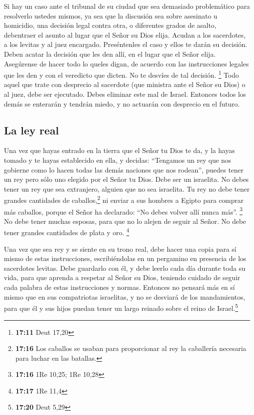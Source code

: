  Si hay un caso ante el tribunal de su ciudad que sea
demasiado problemático para resolverlo ustedes mismos, ya sea que la
discusión sea sobre asesinato u homicidio, una decisión legal contra
otra, o diferentes grados de asalto, debentraer el asunto al lugar que
el Señor su Dios elija.  Acudan a los sacerdotes, a los
levitas y al juez encargado. Preséntenles el caso y ellos te darán su
decisión.  Deben acatar la decisión que les den allí, en
el lugar que el Señor elija. Asegúrense de hacer todo lo queles digan,
 de acuerdo con las instrucciones legales que les den y
con el veredicto que dicten. No te desvíes de tal decisión. \footnote{\textbf{17:11}
  Deut 17,20}  Todo aquel que trate con desprecio al
sacerdote (que ministra ante el Señor su Dios) o al juez, debe ser
ejecutado. Debes eliminar este mal de Israel.  Entonces
todos los demás se enterarán y tendrán miedo, y no actuarán con
desprecio en el futuro.

\hypertarget{la-ley-real}{%
\subsection{La ley real}\label{la-ley-real}}

 Una vez que hayas entrado en la tierra que el Señor tu
Dios te da, y la hayas tomado y te hayas establecido en ella, y decidas:
``Tengamos un rey que nos gobierne como lo hacen todas las demás
naciones que nos rodean'',  puedes tener un rey pero sólo
uno elegido por el Señor tu Dios. Debe ser un israelita. No debes tener
un rey que sea extranjero, alguien que no sea israelita. 
Tu rey no debe tener grandes cantidades de caballos,\footnote{\textbf{17:16}
  Los caballos se usaban para proporcionar al rey la caballería
  necesaria para luchar en las batallas.} ni enviar a sus hombres a
Egipto para comprar más caballos, porque el Señor ha declarado: ``No
debes volver allí nunca más''. \footnote{\textbf{17:16} 1Re 10,25; 1Re
  10,28}  No debe tener muchas esposas, para que no lo
alejen de seguir al Señor. No debe tener grandes cantidades de plata y
oro. \footnote{\textbf{17:17} 1Re 11,4}

 Una vez que sea rey y se siente en su trono real, debe
hacer una copia para sí mismo de estas instrucciones, escribiéndolas en
un pergamino en presencia de los sacerdotes levitas. 
Debe guardarlo con él, y debe leerlo cada día durante toda su vida, para
que aprenda a respetar al Señor su Dios, teniendo cuidado de seguir cada
palabra de estas instrucciones y normas.  Entonces no
pensará más en sí mismo que en sus compatriotas israelitas, y no se
desviará de los mandamientos, para que él y sus hijos puedan tener un
largo reinado sobre el reino de Israel.\footnote{\textbf{17:20} Deut
  5,29}

